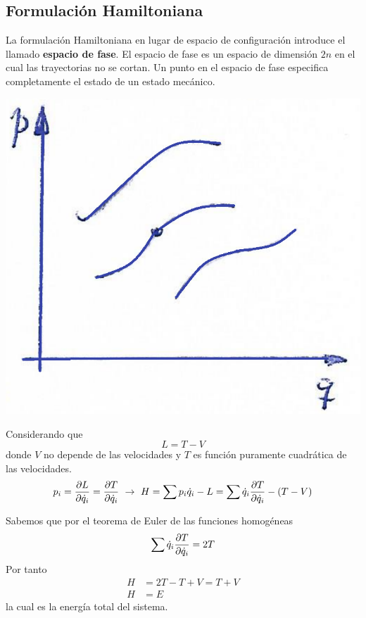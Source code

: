 \documentclass[../main]{subfiles}
\begin{document}
\subsection{Formulación Hamiltoniana}
\begin{minipage}{0.6\textwidth}
    La formulación Hamiltoniana en lugar de espacio de configuración introduce el llamado \textbf{espacio de fase}. El espacio de fase es un espacio de dimensión $2n$ en el cual las trayectorias no se cortan. Un punto en el espacio de fase especifica completamente el estado de un estado mecánico.
\end{minipage}
\begin{minipage}{0.4\textwidth}
    \begin{center}
        \includegraphics[scale=0.3]{figs/img3.2.PNG}
    \end{center}
\end{minipage}
Considerando que
\begin{equation}
    L=T-V
\end{equation}
donde $V$ no depende de las velocidades y $T$ es función puramente cuadrática de las velocidades.
\begin{equation}
    p_i=\pdv{L}{\dot{q}_i}=\pdv{T}{\dot{q}_i} \ \rightarrow \ H=\sum p_i \dot{q}_i-L=\sum \dot{q}_i \pdv{T}{\dot{q}_i}-(T-V)
\end{equation}

Sabemos que por el teorema de Euler de las funciones homogéneas 
\begin{equation}
    \sum \dot{q}_i \pdv{T}{\dot{q}_i}=2T
\end{equation}
Por tanto 
\begin{equation}
    \begin{split}
        H&=2T-T+V=T+V\\
        H&=E
    \end{split}
\end{equation}
la cual es la energía total del sistema.
\end{document}
